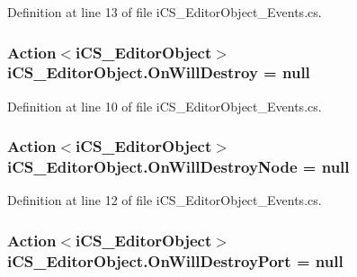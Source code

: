 Definition at line 13 of file i\+C\+S\+\_\+\+Editor\+Object\+\_\+\+Events.\+cs.

\hypertarget{classi_c_s___editor_object_a8173d5b3de1ba851d96187be67bca66b}{
\subsubsection[{On\+Will\+Destroy}]{\setlength{\rightskip}{0pt plus 5cm}Action$<${\bf i\+C\+S\+\_\+\+Editor\+Object}$>$ i\+C\+S\+\_\+\+Editor\+Object.\+On\+Will\+Destroy = null\hspace{0.3cm}{\ttfamily [static]}}}\label{classi_c_s___editor_object_a8173d5b3de1ba851d96187be67bca66b}


Definition at line 10 of file i\+C\+S\+\_\+\+Editor\+Object\+\_\+\+Events.\+cs.

\hypertarget{classi_c_s___editor_object_a01c354cafdafdba95a627e78e2379781}{
\subsubsection[{On\+Will\+Destroy\+Node}]{\setlength{\rightskip}{0pt plus 5cm}Action$<${\bf i\+C\+S\+\_\+\+Editor\+Object}$>$ i\+C\+S\+\_\+\+Editor\+Object.\+On\+Will\+Destroy\+Node = null\hspace{0.3cm}{\ttfamily [static]}}}\label{classi_c_s___editor_object_a01c354cafdafdba95a627e78e2379781}


Definition at line 12 of file i\+C\+S\+\_\+\+Editor\+Object\+\_\+\+Events.\+cs.

\hypertarget{classi_c_s___editor_object_a0f23e29098a2d25b239475a81bbc5ef9}{
\subsubsection[{On\+Will\+Destroy\+Port}]{\setlength{\rightskip}{0pt plus 5cm}Action$<${\bf i\+C\+S\+\_\+\+Editor\+Object}$>$ i\+C\+S\+\_\+\+Editor\+Object.\+On\+Will\+Destroy\+Port = null\hspace{0.3cm}{\ttfamily [static]}}}\label{classi_c_s___editor_object_a0f23e29098a2d25b239475a81bbc5ef9}


